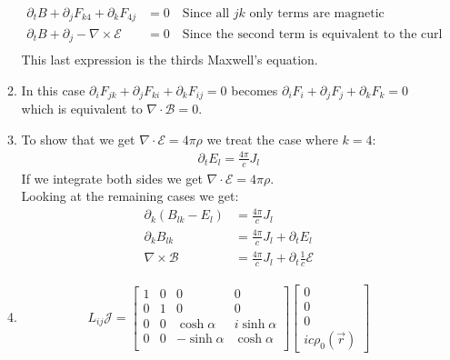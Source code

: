 \documentclass[12pt]{article}
\newcommand{\curl}{\nabla\times}
\newcommand{\divr}{\nabla\cdot}
\begin{document}
\begin{enumerate}
\begin{enumerate}
\begin{align*}
                \partial_t B+\partial_j F_{k4}+\partial_k F_{4j}&=0\quad\text{Since all $jk$ only terms are magnetic}\\
                \partial_t B+\partial_j -\curl\mathcal{E}&=0\quad\text{Since the second term is equivalent to the curl}\\
            \end{align*}
            This last expression is the thirds Maxwell's equation.
            \item In this case $\partial_i F_{jk}+\partial_j F_{ki}+\partial_k F_{ij}=0$ becomes $\partial_i F_{i}+\partial_j F_{j}+\partial_k F_{k}=0$ which is equivalent to $\divr\mathcal{B}=0$.
            \item To show that we get $\divr\mathcal{E}=4\pi\rho$ we treat the case where $k=4$:
            \begin{align*}
                \partial_t E_l=\frac{4\pi}{c}J_l
            \end{align*}
            If we integrate both sides we get $\divr\mathcal{E}=4\pi\rho$.\\
            Looking at the remaining cases we get:
            \begin{align*}
                \partial_k (B_{lk}-E_l)&=\frac{4\pi}{c}J_l\\
                \partial_k B_{lk}&=\frac{4\pi}{c}J_l+\partial_t E_l\\
                \curl\mathcal{B}&=\frac{4\pi}{c}J_l+\partial_t \frac{1}{c}\mathcal{E}
            \end{align*}
            \item
            \begin{gather*}
                L_{ij}\mathcal{J}=
                \begin{bmatrix}
                    1 & 0 & 0            & 0            \\
                    0 & 1 & 0            & 0            \\
                    0 & 0 & \cosh\alpha  & i\sinh\alpha \\
                    0 & 0 & -\sinh\alpha & \cosh\alpha  \\
                \end{bmatrix}
                \begin{bmatrix}
                    0 \\
                    0 \\
                    0 \\
                    ic\rho_0(\vec{r})

\end{bmatrix}
\end{gather*}
\end{enumerate}
\end{enumerate}
\end{document}
